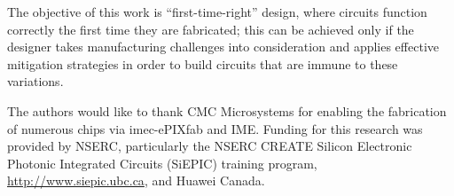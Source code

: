 \documentclass[journal]{spie}
\begin{document}
%
%


The  objective of this work is ``first-time-right'' design, where circuits function correctly the first time they are fabricated; this can be achieved only if the designer takes manufacturing challenges into consideration and applies effective mitigation strategies in order to build circuits that are immune to these variations.



\acknowledgments

The authors would like to thank CMC Microsystems for enabling the fabrication of numerous chips via imec-ePIXfab and IME.  Funding for this research was provided by NSERC, particularly the NSERC CREATE Silicon Electronic Photonic Integrated Circuits (SiEPIC) training program, \url{http://www.siepic.ubc.ca}, and Huawei Canada.



\end{document}
